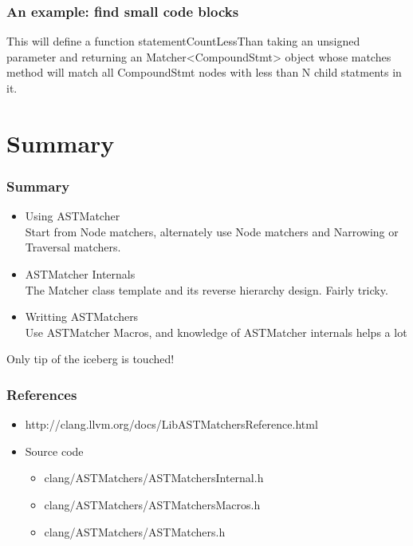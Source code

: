 \documentclass[]{beamer}
\begin{document}
\begin{frame}
  \frametitle{An example: find small code blocks}
  
  This will define a function \alert{statementCountLessThan}
  taking an \alert{unsigned} parameter and returning an 
  Matcher<\alert{CompoundStmt}> object whose matches method 
  will match all \alert{CompoundStmt} nodes with less than \alert{N}
  child statments in it.
\end{frame}

\section{Summary}
\frame{\tableofcontents[currentsection]}
\begin{frame}
  \frametitle{Summary}
  \begin{itemize}
    \item Using ASTMatcher\\
      Start from Node matchers, alternately use Node matchers and Narrowing
      or Traversal matchers.
    \item ASTMatcher Internals\\
      The Matcher class template and its reverse hierarchy design.
      Fairly tricky.
    \item Writting ASTMatchers\\
      Use ASTMatcher Macros, and knowledge of ASTMatcher internals helps
      a lot
  \end{itemize}
  \pause
  \alert{Only tip of the iceberg is touched!}
\end{frame}

\begin{frame}
  \frametitle{References}
  \begin{itemize}
    \item http://clang.llvm.org/docs/LibASTMatchersReference.html
    \item Source code
      \begin{itemize}
        \item \alert{clang/ASTMatchers/ASTMatchersInternal.h}
        \item clang/ASTMatchers/ASTMatchersMacros.h
        \item clang/ASTMatchers/ASTMatchers.h
      \end{itemize}
  \end{itemize}
\end{frame}

\end{document}
